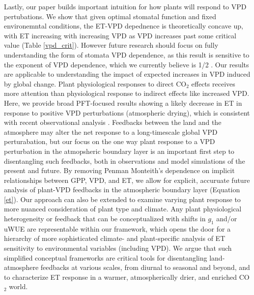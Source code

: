 \documentclass[draft,linenumbers]{agujournal}
\begin{document}
Lastly, our paper builds important intuition for how plants will
respond to VPD pertubations. We show that given optimal stomatal
function and fixed environemntal conditions, the ET-VPD depednence is
theoretically concave up, with ET increasing with increasing VPD as
VPD increases past some critical value (Table \ref{vpd_crit}). However
future research should focus on fully understanding the form of
stomata VPD dependence, as this result is sensitive to the exponent of
VPD dependence, which we currently believe is 1/2 \citep{MEDLYN_2011,
  Zhou_2014}. Our results are applicable to understanding the impact
of  expected increases in VPD
induced by global change.  Plant physiological responses to direct
CO$_2$ effects \citep[e.g.,][]{Swann_2016} receives more attention
than physiological response to indirect effects like increased
VPD. Here, we provide broad PFT-focused results showing a likely
decrease in ET in response to positive VPD perturbations (atmospheric
drying), which is consistent with recent observational analysis
\citep[e.g.,][]{Rigden_2017}. Feedbacks between the land and the
atmosphere may alter the net response to a long-timescale global VPD perturabation,
but our focus on the one way plant response to a VPD perturbation in
the atmopsheric boundary layer is an important first step to
disentangling such feedbacks, both in observations and model
simulations of the present and future. By removing Penman Monteith's
dependence on implicit relationships between GPP, VPD, and ET, we
allow for explicit, accuruate future analysis of plant-VPD feedbacks
in the atmospheric boundary layer (Equation \ref{et}). Our approach
can also be extended to examine varying plant response to more nuanced
consideration of plant type and climate. Any plant physiological
heterogeneity or feedback that can be conceptualized with shifts in $g_1$
\citep[e.g.][]{Lin_2015, Medlyn_2017} and/or uWUE
\citep[e.g.][]{Zhou_2014} are representable within our framework, which
opens the door for a hierarchy of more sophisticated climate- and
plant-specific analysis of ET sensitivity to environmental variables
(including VPD). We argue that such simplified conceptual frameworks
are critical tools for disentangling land-atmosphere feedbacks at
various scales, from diurnal to seasonal and beyond, and to
characterize ET response in a warmer, atmospherically drier, and
enriched CO$_2$ world.
\end{document}
